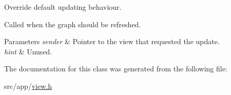Override default updating behaviour. 

Called when the graph should be refreshed. 
\begin{DoxyParams}{Parameters}
{\em sender} & Pointer to the view that requested the update. \\
\hline
{\em hint} & Unused. \\
\hline
\end{DoxyParams}


The documentation for this class was generated from the following file:\begin{DoxyCompactItemize}
\item 
src/app/\hyperlink{view_8h}{view.h}\end{DoxyCompactItemize}
